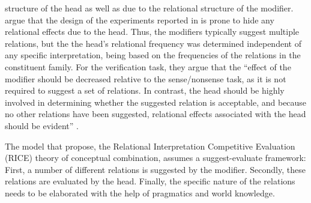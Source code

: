 structure of the head as well as due to the relational structure of
the modifier. 
\citet[286--287]{Spaldingetal:2010} argue that
the design of the experiments reported in \citet{GagneandShoben:1997}
is prone to hide any relational effects due to the head. Thus, the
modifiers typically suggest multiple relations, but the the head's
relational frequency was determined independent of any specific
interpretation, being based on the frequencies of the relations in the
constituent family. For the verification task, they argue that the ``effect of the modifier should be decreased relative to the
sense/nonsense task, as it is not required to suggest a set of
relations. In contrast, the head should be highly involved in
determining whether the suggested relation is acceptable, and because
no other relations have been suggested, relational effects associated
with the head should be evident'' \citep[288]{Spaldingetal:2010}. 

\newpage
The model that \citet{Spaldingetal:2010} propose, the
Relational Interpretation Competitive Evaluation (RICE) theory of
conceptual combination, assumes a suggest-evaluate framework: First, a
number of different relations is suggested by the modifier. Secondly,
these relations are evaluated by the head. Finally, the specific
nature of the relations needs to be elaborated with the help of
pragmatics and world knowledge. 







